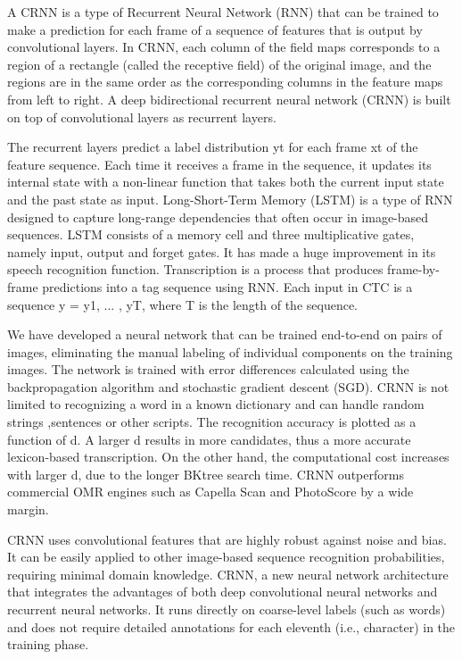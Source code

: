 A CRNN is a type of Recurrent Neural Network (RNN) that can be trained to make
a prediction for each frame of a sequence of features that is output by
convolutional layers. In CRNN, each column of the field maps corresponds to
a region of a rectangle (called the receptive field) of the original image, and
the regions are in the same order as the corresponding columns in the feature
maps from left to right. A deep bidirectional recurrent neural network (CRNN) is
built on top of convolutional layers as recurrent layers.

The recurrent layers predict a label distribution yt for each frame xt of the
feature sequence. Each time it receives a frame in the sequence, it updates its
internal state with a non-linear function that takes both the current input
state and the past state as input. Long-Short-Term Memory (LSTM) is a type of
RNN designed to capture long-range dependencies that often occur in image-based
sequences. LSTM consists of a memory cell and three multiplicative gates, namely
input, output and forget gates. It has made a huge improvement in its speech
recognition function.  Transcription is a process that produces frame-by-frame
predictions into a tag sequence using RNN. Each input in CTC is a sequence
y = y1, ... , yT, where T is the length of the sequence.

We have developed a neural network that can be trained end-to-end on pairs of
images, eliminating the manual labeling of individual components on the training
images. The network is trained with error differences calculated using the
backpropagation algorithm and stochastic gradient descent (SGD).  CRNN is not
limited to recognizing a word in a known dictionary and can handle random
strings ,sentences or other scripts.  The recognition accuracy is plotted as
a function of d. A larger d results in more candidates, thus a more accurate
lexicon-based transcription. On the other hand, the computational cost increases
with larger d, due to the longer BKtree search time. CRNN outperforms commercial
OMR engines such as Capella Scan and PhotoScore by a wide margin.


CRNN uses convolutional features that are highly robust against noise and bias.
It can be easily applied to other image-based sequence recognition
probabilities, requiring minimal domain knowledge.  CRNN, a new neural network
architecture that integrates the advantages of both deep convolutional neural
networks and recurrent neural networks. It runs directly on coarse-level labels
(such as words) and does not require detailed annotations for each eleventh
(i.e., character) in the training phase.







